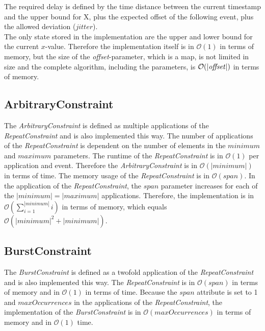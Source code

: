 	The required delay is defined by the time distance between the current timestamp and the upper bound for X, plus the expected offset of the following event, plus the allowed deviation ($jitter$).\\
	The only state stored in the implementation are the upper and lower bound for the  current $x$-value. Therefore the implementation itself is in $\mathcal{O}(1)$ in terms of memory, but the size of the \textit{offset}-parameter, which is a map, is not limited in size and the complete algorithm, including the parameters, is $\mathcal{O}(|\text{\textit{offset}}|)$ in terms of memory.
	
\subsection{ArbitraryConstraint}
	The \emph{ArbitraryConstraint} is defined as multiple applications of the \emph{RepeatConstraint} and is also implemented this way. The number of applications of the \emph{RepeatConstraint} is dependent on the number of elements in the $minimum$ and $maximum$ parameters. The runtime of the \emph{RepeatConstraint} is in $\mathcal{O}(1)$ per application and event. Therefore the \emph{ArbitraryConstraint} is in $\mathcal{O}(|minimum|)$ in terms of time. The memory usage of the \emph{RepeatConstraint} is in $\mathcal{O}(span)$. In the application of the \emph{RepeatConstraint}, the $span$ parameter increases for each of the $|minimum| = |maximum|$ applications. Therefore, the implementation is in $\mathcal{O}(\sum_{i=1}^{|minimum|}i)$ in terms of memory, which equals $\mathcal{O}(|minimum|^2+|minimum|)$.

\subsection{BurstConstraint}
	The \textit{BurstConstraint} is defined as a twofold application of the \emph{RepeatConstraint} and is also implemented this way. The \textit{RepeatConstraint} is in $\mathcal{O}(span)$ in terms of memory and in $\mathcal{O}(1)$ in terms of time. Because the $span$ attribute is set to 1 and $maxOccurrences$ in the applications of the \textit{RepeatConstraint}, the implementation of the \emph{BurstConstraint} is in $\mathcal{O}(maxOccurrences)$ in terms of memory and in $\mathcal{O}(1)$ time.

